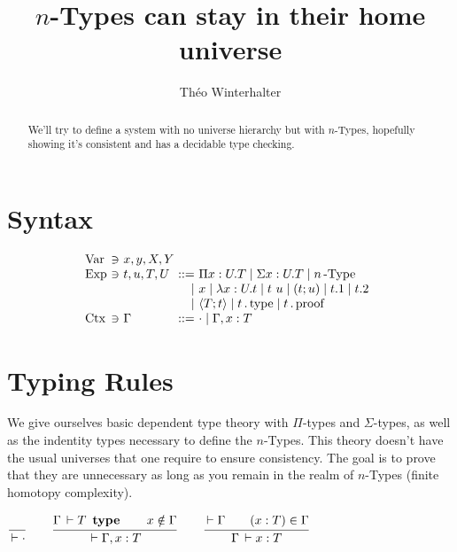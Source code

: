 \documentclass[a4paper,english]{lipics-utf8x}
\title{$n$-Types can stay in their home universe}
\author[1]{Théo Winterhalter}
\begin{document}
  \maketitle

  \begin{abstract}
    We'll try to define a system with no universe hierarchy but with
    $n$-Types, hopefully showing it's consistent and has a decidable type
    checking.
  \end{abstract}

  \section{Syntax}

  \[
    \begin{array}{l@{~}l@{~}l@{~}r@{~}l@{\quad}l}
      \Var  & \ni & x,y,X,Y \\
      \Exp  & \ni & t,u,T,U & ::= & \Pi x:U.T \mid \Sigma x:U.T \mid
                                    \nType{n} \\
                         &&& \mid & x \mid \lambda x:U.t \mid t~u
                               \mid (t;u) \mid t.1 \mid t.2 \\
                         &&& \mid & \hsig{T ; t}
                               \mid t \gettype \mid t \getproof \\
      \Ctx  & \ni & \Gamma  & ::= & \cdot \mid \Gamma, x:T \\
    \end{array}
  \]

  \section{Typing Rules}

  We give ourselves basic dependent type theory with $\Pi$-types and
  $\Sigma$-types, as well as the indentity types necessary to define the
  $n$-Types.
  This theory doesn't have the usual universes that one require to ensure
  consistency. The goal is to prove that they are unnecessary as long as you
  remain in the realm of $n$-Types (finite homotopy complexity).

  \begin{center}
  \(
    \ru{}{\der \cdot}
    \qquad
    \ru{\Gamma \der T \type \qquad
        x \notin \Gamma
      }{\der \Gamma, x : T}
    \qquad
    \ru{\der \Gamma \qquad
        (x : T) \in \Gamma
      }{\Gamma \der x : T}
  \)
  \end{center}
\end{document}
